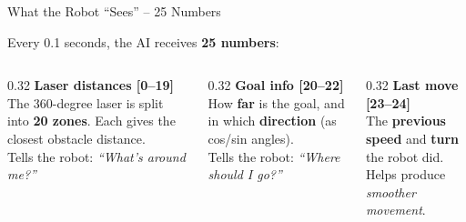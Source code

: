 \documentclass[aspectratio=169, 11pt]{beamer}
\begin{document}
\begin{frame}{What the Robot ``Sees'' -- 25 Numbers}

  Every 0.1 seconds, the AI receives \textbf{25 numbers}:

  \vspace{0.4em}

  \begin{center}
  \end{center}

  \vspace{0.4em}

  \begin{columns}[T]
    \begin{column}{0.32\textwidth}
      \textbf{\color{upecdark}Laser distances [0--19]}\\[0.2em]
      \small
      The 360-degree laser is split into \textbf{20 zones}.
      Each gives the closest obstacle distance.\\[0.2em]
      {\scriptsize Tells the robot: \textit{``What's around me?''}}
    \end{column}
    \begin{column}{0.32\textwidth}
      \textbf{\color{upecred}Goal info [20--22]}\\[0.2em]
      \small
      How \textbf{far} is the goal, and in which
      \textbf{direction} (as cos/sin angles).\\[0.2em]
      {\scriptsize Tells the robot: \textit{``Where should I go?''}}
    \end{column}
    \begin{column}{0.32\textwidth}
      \textbf{\color{softgreen!80!black}Last move [23--24]}\\[0.2em]
      \small
      The \textbf{previous speed} and \textbf{turn}
      the robot did.\\[0.2em]
      {\scriptsize Helps produce \textit{smoother movement}.}
    \end{column}
  \end{columns}
\end{frame}
\end{document}
